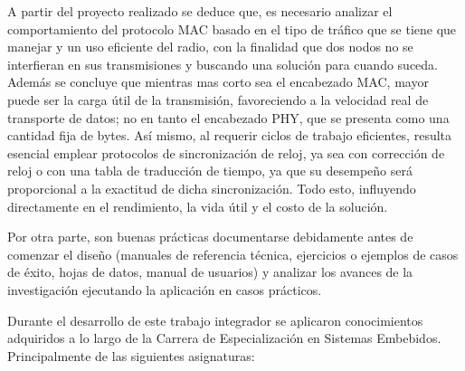 A partir del proyecto realizado se deduce que, es necesario analizar el comportamiento del protocolo MAC basado en el tipo de tráfico que se tiene que manejar y un uso eficiente del radio, con la finalidad que dos nodos no se interfieran en sus transmisiones y buscando una solución para cuando suceda. Además se concluye que mientras mas corto sea el encabezado MAC, mayor puede ser la carga útil de la transmisión, favoreciendo a la velocidad real de transporte de datos; no en tanto el encabezado PHY, que se presenta como una cantidad fija de bytes. Así mismo, al requerir ciclos de trabajo eficientes, resulta esencial emplear protocolos de sincronización de reloj, ya sea con corrección de reloj o con una tabla de traducción de tiempo, ya que su desempeño será proporcional a la exactitud de dicha sincronización. Todo esto, influyendo directamente en el rendimiento, la vida útil y el costo de la solución.


Por otra parte, son buenas prácticas documentarse debidamente antes de comenzar el diseño (manuales de referencia técnica, ejercicios o ejemplos de casos de éxito, hojas de datos, manual de usuarios) y analizar los avances de la investigación ejecutando la aplicación en casos prácticos.

\medskip
Durante el desarrollo de este trabajo integrador se aplicaron conocimientos adquiridos a lo largo de la Carrera de Especialización en Sistemas Embebidos. Principalmente de las siguientes asignaturas: 

